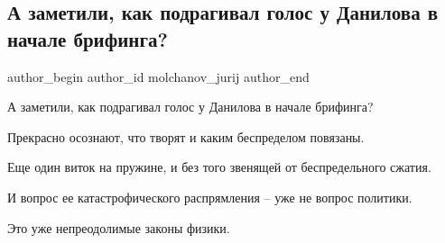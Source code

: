 
 
 
 
 
 
\subsection{А заметили, как подрагивал голос у Данилова в начале брифинга?}
\label{sec:11_02_2022.fb.molchanov_jurij.1.danilov}
 
\ifcmt
 author_begin
   author_id molchanov_jurij
 author_end
\fi

А заметили, как подрагивал голос у Данилова в начале брифинга? 

Прекрасно осознают, что творят и каким беспределом повязаны.

Еще один виток на пружине, и без того звенящей от беспредельного сжатия.

И вопрос ее катастрофического распрямления – уже не вопрос политики.

Это уже непреодолимые законы физики.

